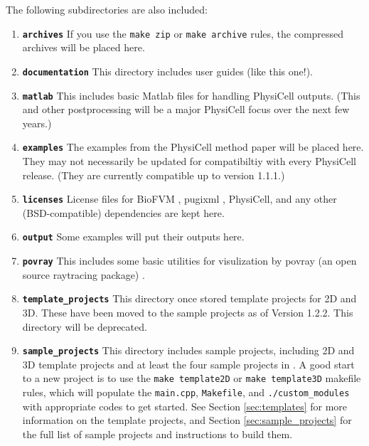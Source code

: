 \documentclass[12pt]{article}
\renewcommand{\v}{\verb}
\newcommand{\smallcode}[1]{\textbf{\texttt{#1}}}
\begin{document}
The following subdirectories are also included: 
\begin{enumerate}
\item 
\smallcode{archives} If you use the \v|make zip| or \v|make archive| rules, the compressed archives will be placed here.  
\item 
\smallcode{documentation} This directory includes user guides (like this one!). 
\item 
\smallcode{matlab} This includes basic Matlab files for handling PhysiCell outputs. (This and other postprocessing 
will be a major PhysiCell focus over the next few years.) 
\item
\smallcode{examples} The examples from the PhysiCell method paper will be placed here. They may not 
necessarily be updated for compatibiltiy with every PhysiCell release. (They are currently compatible up to version 
1.1.1.) 
\item 
\smallcode{licenses} License files for BioFVM \cite{ref:BioFVM}, pugixml \cite{ref:pugixml}, PhysiCell, 
and any other (BSD-compatible) dependencies are kept here. 
\item 
\smallcode{output} Some examples will put their outputs here. 
\item 
\smallcode{povray} This includes some basic utilities for visulization by povray (an open source raytracing package) \cite{ref:povray}. 
\item 
\smallcode{template\_projects} This directory once stored template projects for 2D and 3D. These have been 
moved to the sample projects as of Version 1.2.2. This directory will be deprecated. 
\item 
\smallcode{sample\_projects} This directory includes sample projects, including 2D and 3D template projects 
and at least the four sample projects in \cite{ref:PhysiCell}.  A good start to a new 
project is to use the \v|make template2D| or \v|make template3D| makefile rules, 
which will populate the \v|main.cpp|, \v|Makefile|, and \v|./custom_modules| with appropriate 
codes to get started. See Section \ref{sec:templates} for more information on the 
template projects, and Section \ref{sec:sample_projects} for the full list of sample 
projects and instructions to build them. 



\end{enumerate}
\end{document}
